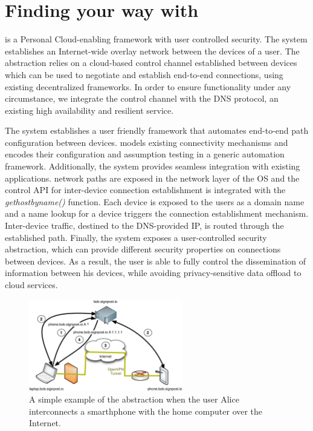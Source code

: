 \section{Finding your way with \signpost}\label{sec:sp-signpost}

\signpost is a Personal Cloud-enabling framework with user controlled security.
The system establishes an Internet-wide overlay network between the devices of a
user. The abstraction relies on a cloud-based control channel established
between devices which can be used to negotiate and establish
end-to-end connections, using existing decentralized frameworks. In order to
ensure functionality under any circumstance, we integrate the control channel
with the DNS protocol, an existing high availability and resilient service. 

The system establishes a user friendly framework that automates end-to-end path
configuration between devices.  \signpost models existing connectivity
mechanisms and encodes their configuration and assumption testing in a generic
automation framework.  Additionally, the system provides seamless integration
with existing applications. \signpost network paths are exposed in the network
layer of the OS and  the control API for inter-device connection establishment
is integrated with the \textit{gethostbyname()} function.  Each device is
exposed to the users as a domain name and a name lookup for a device triggers
the connection establishment mechanism. Inter-device traffic, destined to the
DNS-provided IP, is routed through the established path.  Finally, the system
exposes a user-controlled security abstraction, which can provide different
security properties on connections between devices. As a result, the user is
able to fully control the dissemination of information between his devices,
while avoiding privacy-sensitive data offload to cloud services. 

\begin{figure}[ht]
  \begin{center}
	\includegraphics[width=0.6\textwidth]{Chapter3/Chapter3Figs/sp-illustration}
  \end{center}
  \caption{A simple example of the \signpost abstraction when the user Alice
    interconnects a smarthphone with the home computer over the Internet.}
  \label{fig:signpost-user-abstraction}
\end{figure}

